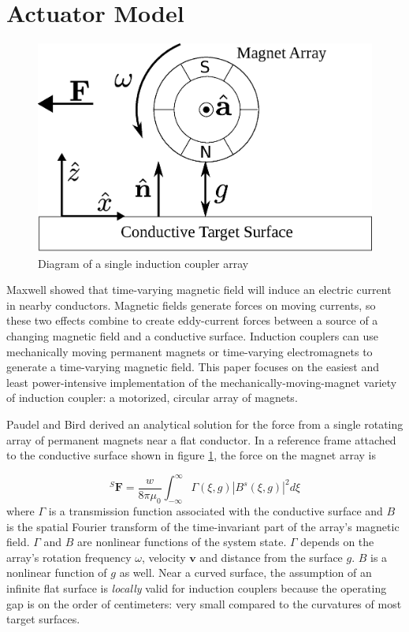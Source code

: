 \documentclass[letterpaper, 10 pt, conference]{ieeeconf}  %
\newcommand{\ben}[1]{{\color{red}\small\par {[{\bf Ben says:} {\em #1}} ] \\    }}
\begin{document}
%
\section{Actuator Model}
\label{sec:model}
 \begin{figure}[thpb]
      \centering
      \includegraphics[width = 0.75\linewidth]{figures/spin_mag_diagram.eps}
      \caption{Diagram of a single induction coupler array}
      \label{fig:single_array}
   \end{figure}
\par Maxwell showed that time-varying magnetic field will induce an electric current in nearby conductors. Magnetic fields generate forces on moving currents, so these two effects combine to create eddy-current forces between a source of a changing magnetic field and a conductive surface. Induction couplers can use mechanically moving permanent magnets or time-varying electromagnets to generate a time-varying magnetic field. This paper focuses on the easiest and least power-intensive implementation of the mechanically-moving-magnet variety of induction coupler: a motorized, circular array of magnets. 
%
\par Paudel and Bird derived an analytical solution for the force from a single rotating array of permanent magnets near a flat conductor. \cite{Paudel2013} In a reference frame attached to the conductive surface shown in figure \ref{fig:single_array}, the force on the magnet array is

\begin{equation}
\label{eq:Paudel55}
{}^S\textbf{F} = \frac{w}{8\pi\mu_0} \int^{\infty}_{-\infty}\Gamma(\xi,g)|B^s(\xi,g)|^2 d\xi
\end{equation}
where $\Gamma$ is a transmission function associated with the conductive surface and $B$ is the spatial Fourier transform of the time-invariant part of the array's magnetic field.
$\Gamma$ and $B$ are nonlinear functions of the system state. $\Gamma$ depends on the array's rotation frequency $\omega$, velocity $\textbf{v}$ and distance from the surface $g$. $B$ is a nonlinear function of $g$ as well. Near a curved surface, the assumption of an infinite flat surface is \textit{locally} valid for induction couplers because the operating gap is on the order of centimeters: very small compared to the curvatures of most target surfaces. 
 
\end{document}
